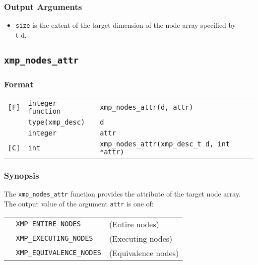 \subsubsection*{Output Arguments}

\begin{itemize}
 \item {\tt size} is the extent of the target dimension of the node array
       specified by {\\t d}.
\end{itemize}


\subsection{\tt xmp\_nodes\_attr}\label{sub:xmpnodesattr}

\subsubsection*{Format}

\begin{tabular}{lll}

\verb![F]!& {\tt integer function}& {\tt xmp\_nodes\_attr(d, attr)}\\
          & {\tt type(xmp\_desc)} & {\tt d}\\
          & {\tt integer} & {\tt attr}\\

\verb![C]!&  {\tt int}& {\tt xmp\_nodes\_attr(xmp\_desc\_t d, int *attr)}\\

\end{tabular}

\subsubsection*{Synopsis}

The {\tt xmp\_nodes\_attr} function provides the attribute of the target
node array. The output value of the argument {\tt attr} is one of:

\begin{tabular}{lll}
  \hspace{2.5cm} & {\tt XMP\_ENTIRE\_NODES} & (Entire nodes)\\
                 & {\tt XMP\_EXECUTING\_NODES}  & (Executing nodes) \\
                 & {\tt XMP\_EQUIVALENCE\_NODES} & (Equivalence nodes) \\
\end{tabular}

